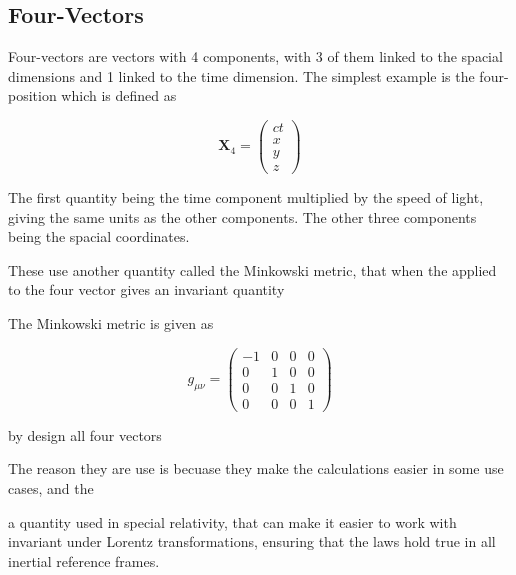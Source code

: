 \appendix
\chapter{}

\section{Four-Vectors}\label{sect: Four-Vectors}

Four-vectors are vectors with 4 components, with 3 of them linked to the spacial dimensions and 1 linked to the time dimension.
The simplest example is the four-position which is defined as

\begin{equation}
	\mathbf{X}_4 = \begin{pmatrix}
		ct \\
		x  \\
		y  \\
		z
	\end{pmatrix}
\end{equation}

The first quantity being the time component multiplied by the speed of light, giving the same units as the other components.
The other three components being the spacial coordinates.

These use another quantity called the Minkowski metric, that when the applied to the four vector gives an invariant quantity

The Minkowski metric is given as

\begin{equation}
	g_{\mu\nu} = \begin{pmatrix}
		-1 & 0 & 0 & 0 \\
		0  & 1 & 0 & 0 \\
		0  & 0 & 1 & 0 \\
		0  & 0 & 0 & 1
	\end{pmatrix}
\end{equation}

by design all four vectors

The reason they are use is becuase they make the calculations easier in some use cases, and the

a quantity used in special relativity, that can make it easier to work with invariant under Lorentz transformations, ensuring that the laws hold true in all inertial reference frames.

